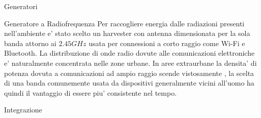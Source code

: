 \begin{multicols}{2}
\begin{section}{Generatori}
    \begin{subsection}{Generatore a Radiofrequenza}
        Per raccogliere energia dalle radiazioni presenti nell'ambiente e' stato scelto un harvester con antenna dimensionata per la sola banda attorno ai \(2.45GHz\) usata per connessioni a corto raggio come Wi-Fi e Bluetooth. La distribuzione di onde radio dovute alle comunicazioni elettroniche e' naturalmente concentrata nelle zone urbane. In aree extraurbane la densita' di potenza dovuta a comunicazioni ad ampio raggio scende vistosamente \cite{ibrahimRadioFrequencyEnergy2022}, la scelta di una banda comunemente usata da dispositivi generalmente vicini all'uomo ha quindi il vantaggio di essere piu' consistente nel tempo.
    \end{subsection}

    \begin{subsection}{Integrazione}
        
    \end{subsection}

\end{section}

\end{multicols}